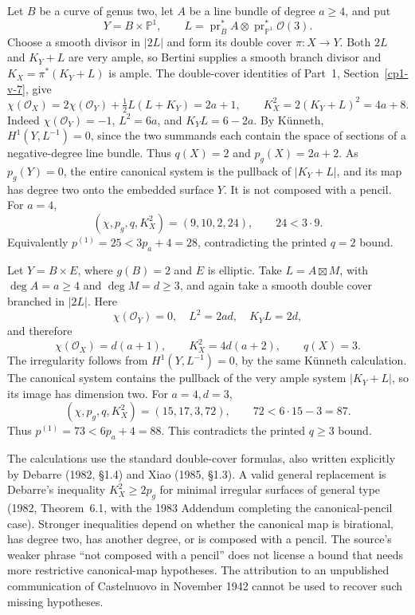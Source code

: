 \begin{example}[A double cover with \(q=2\)]
\label{cp2-xi-false-bound-q2}
Let \(B\) be a curve of genus two, let \(A\) be a line bundle of degree \(a\ge4\), and put
\[
Y=B\times\mathbb P^1,\qquad
L=\operatorname{pr}_B^*A\otimes\operatorname{pr}_{\mathbb P^1}^*\mathcal O(3).
\]
Choose a smooth divisor in \( |2L|\) and form its double cover \(\pi:X\to Y\). Both \(2L\) and \(K_Y+L\) are very ample, so Bertini supplies a smooth branch divisor and \(K_X=\pi^*(K_Y+L)\) is ample. The double-cover identities of Part~1, Section~\ref{cp1-v-7}, give
\[
\chi(\mathcal O_X)=2\chi(\mathcal O_Y)+\tfrac12 L(L+K_Y)=2a+1,
\qquad K_X^2=2(K_Y+L)^2=4a+8.
\]
Indeed \(\chi(\mathcal O_Y)=-1\), \(L^2=6a\), and \(K_YL=6-2a\). By K\"unneth, \(H^1(Y,L^{-1})=0\), since the two summands each contain the space of sections of a negative-degree line bundle. Thus \(q(X)=2\) and \(p_g(X)=2a+2\). As \(p_g(Y)=0\), the entire canonical system is the pullback of \( |K_Y+L|\), and its map has degree two onto the embedded surface \(Y\). It is not composed with a pencil. For \(a=4\),
\[
(\chi,p_g,q,K_X^2)=(9,10,2,24),\qquad24<3\cdot9.
\]
Equivalently \(p^{(1)}=25<3p_a+4=28\), contradicting the printed \(q=2\) bound.
\end{example}

\begin{example}[A double cover with \(q=3\)]
\label{cp2-xi-false-bound-q3}
Let \(Y=B\times E\), where \(g(B)=2\) and \(E\) is elliptic. Take \(L=A\boxtimes M\), with \(\deg A=a\ge4\) and \(\deg M=d\ge3\), and again take a smooth double cover branched in \( |2L|\). Here
\[
\chi(\mathcal O_Y)=0,\quad L^2=2ad,\quad K_YL=2d,
\]
and therefore
\[
\chi(\mathcal O_X)=d(a+1),\qquad
K_X^2=4d(a+2),\qquad q(X)=3.
\]
The irregularity follows from \(H^1(Y,L^{-1})=0\), by the same K\"unneth calculation. The canonical system contains the pullback of the very ample system \( |K_Y+L|\), so its image has dimension two. For \(a=4,d=3\),
\[
(\chi,p_g,q,K_X^2)=(15,17,3,72),\qquad72<6\cdot15-3=87.
\]
Thus \(p^{(1)}=73<6p_a+4=88\). This contradicts the printed \(q\ge3\) bound.
\end{example}

The calculations use the standard double-cover formulas, also written explicitly by Debarre (1982, \S1.4) and Xiao (1985, \S1.3). A valid general replacement is Debarre's inequality \(K_X^2\ge2p_g\) for minimal irregular surfaces of general type (1982, Theorem~6.1, with the 1983 Addendum completing the canonical-pencil case). Stronger inequalities depend on whether the canonical map is birational, has degree two, has another degree, or is composed with a pencil. The source's weaker phrase ``not composed with a pencil'' does not license a bound that needs more restrictive canonical-map hypotheses. The attribution to an unpublished communication of Castelnuovo in November 1942 cannot be used to recover such missing hypotheses.

